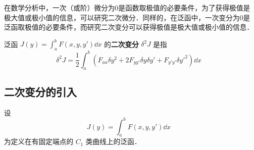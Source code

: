 
\begin{issues}
\issueTODO
\end{issues}

在数学分析中，一次（或阶）微分为0是函数取极值的必要条件，为了获得极值是极大值或极小值的信息，可以研究二次微分．同样的，在泛函中，一次变分为0是泛函取极值的必要条件，而研究二次变分可以获得极值是极大值或极小值的信息．

泛函 $J(y)=\int_a^bF(x,y,y')\dd x$ 的\textbf{二次变分} $\delta^2J$ 是指
\begin{equation}
\delta^2J=\frac{1}{2}\int_a^b(F_{aa}\delta y^2+2F_{yy'}\delta y\delta y'+F_{y'y'}\delta y'^2)\dd x
\end{equation}
\subsection{二次变分的引入}
设 
\begin{equation}
J(y)=\int_a^bF(x,y,y')\dd x
\end{equation}
为定义在有固定端点的 $C_1$ 类曲线上的泛函．

